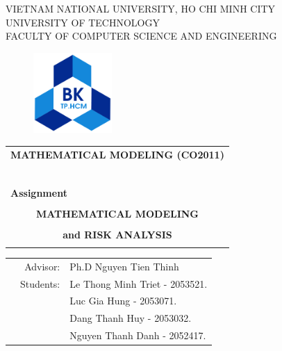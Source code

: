 \documentclass[a4paper]{article}
\begin{document}
\begin{titlepage}
	\begin{center}
		VIETNAM NATIONAL UNIVERSITY, HO CHI MINH CITY \\
		UNIVERSITY OF TECHNOLOGY \\
		FACULTY OF COMPUTER SCIENCE AND ENGINEERING
	\end{center}

	\vspace{1cm}

	\begin{figure}[h!]
		\begin{center}
			\includegraphics[width=3cm]{hcmut.png}
		\end{center}
	\end{figure}

	\vspace{1cm}


	\begin{center}
		\begin{tabular}{c}
			\multicolumn{1}{c}{\textbf{{\Large MATHEMATICAL MODELING (CO2011)}}} \\
			~~                                                                    \\
			\hline
			\\
			\multicolumn{1}{l}{\textbf{{\Large Assignment}}}                      \\
			\\
			\textbf{{\Huge MATHEMATICAL MODELING}}                                \\
			\\
			\textbf{{\Huge and RISK ANALYSIS}}                                    \\
			\\
			\hline
		\end{tabular}
	\end{center}

	\vspace{2cm}

	\begin{table}[h]
		\begin{tabular}{rrl}
			\hspace{5 cm} & Advisor:  & Ph.D Nguyen Tien Thinh         \\
			              & Students: & Le Thong Minh Triet - 2053521. \\
			              &           & Luc Gia Hung - 2053071.        \\
			              &           & Dang Thanh Huy - 2053032.      \\
			              &           & Nguyen Thanh Danh - 2052417.   \\
		\end{tabular}
	\end{table}


\end{titlepage}
\end{document}
